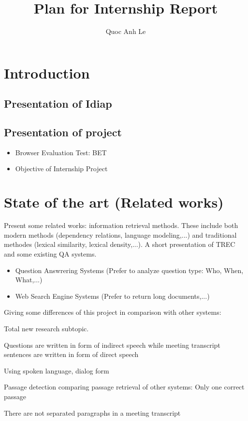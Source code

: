 \documentclass[10pt,a4paper]{article}
\author{Quoc Anh Le}
\title{Plan for Internship Report}
\begin{document}
\section	{Introduction}
\subsection{Presentation of Idiap}
\subsection{Presentation of project}
\begin{itemize}
\item {Browser Evaluation Test: BET}
\item {Objective of Internship Project}
\end{itemize}

\section{State of the art (Related works)}
Present some related works: information retrieval methods. These include both modern methods (dependency relations, language modeling,...) and traditional methodes (lexical similarity, lexical density,...). A short presentation of TREC and some existing QA systems. 
\begin{itemize}
\item {Question Answrering Systems (Prefer to analyze question type: Who, When, What,...)}
\item {Web Search Engine Systems (Prefer to return long documents,...)}
\end{itemize}



Giving some differences of this project in comparison with other systems: 

Total new research subtopic.

\begin{list} {}{}
\item {Questions are written in form of indirect speech while meeting transcript sentences are written in form of direct speech}
\item {Using spoken language, dialog form}
\item {Passage detection comparing passage retrieval of other systems: Only one correct passage}
\item {There are not separated paragraphs in a meeting transcript}
\end{list}
\end{document}
